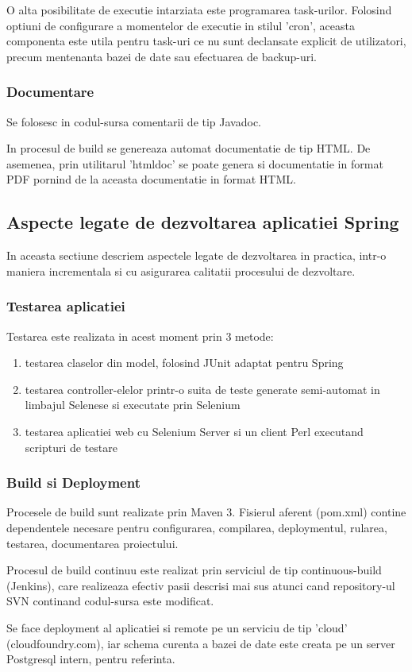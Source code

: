 O alta posibilitate de executie intarziata este programarea task-urilor.
Folosind optiuni de configurare a momentelor de executie in stilul 'cron',
aceasta componenta este utila pentru task-uri ce nu sunt declansate explicit de
utilizatori, precum mentenanta bazei de date sau efectuarea de backup-uri.

\subsubsection{Documentare}
Se folosesc in codul-sursa comentarii de tip Javadoc. 

In procesul de build se genereaza automat documentatie  de tip HTML. 
De asemenea, prin utilitarul 'htmldoc' se poate genera
si documentatie in format PDF pornind de la aceasta documentatie in format HTML.

\subsection{Aspecte legate de dezvoltarea aplicatiei Spring}
In aceasta sectiune descriem aspectele legate de dezvoltarea in practica, intr-o
maniera incrementala si cu asigurarea calitatii procesului de dezvoltare.

\subsubsection{Testarea aplicatiei}
Testarea este realizata in acest moment prin 3 metode:
\begin{enumerate}
  \item testarea claselor din model, folosind JUnit adaptat pentru Spring
  \item testarea controller-elelor printr-o suita de teste generate semi-automat
  in limbajul Selenese si executate prin Selenium
  \item testarea aplicatiei web cu Selenium Server si un client Perl executand
  scripturi de testare
\end{enumerate}

\subsubsection{Build si Deployment}
Procesele de build sunt realizate prin Maven 3. Fisierul aferent (pom.xml)
contine dependentele necesare pentru configurarea, compilarea,
deploymentul, rularea, testarea, documentarea proiectului.

Procesul de build continuu este realizat prin 
serviciul de tip continuous-build (Jenkins), 
care realizeaza efectiv pasii descrisi mai sus 
atunci cand repository-ul SVN continand codul-sursa este modificat. 

Se face deployment al aplicatiei si remote pe un
serviciu de tip 'cloud' (cloudfoundry.com), 
iar schema curenta a bazei de date este creata pe un server Postgresql intern,
pentru referinta.
